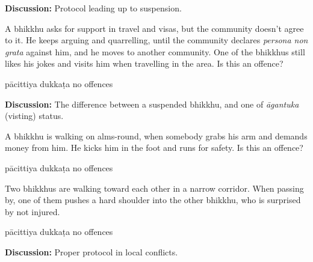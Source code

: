 \begin{exam}{\autoExamName}
\begin{problem}
  \textbf{Discussion:} Protocol leading up to suspension.

  \end{problem}

  \problemDivide

  \begin{problem}

    A bhikkhu asks for support in travel and visas, but the community doesn't
    agree to it. He keeps arguing and quarrelling, until the community declares
    \textit{persona non grata} against him, and he moves to another community.
    One of the bhikkhus still likes his jokes and visits him when travelling in
    the area. Is this an offence?

    \bigskip

    \begin{answers}{3}
      \bChoices
       pācittiya\eAns
       dukkaṭa\eAns
       no offences\eAns
      \eChoices
    \end{answers}

    \bigskip

    \textbf{Discussion:} The difference between a suspended bhikkhu, and one
    of \textit{āgantuka} (visting) status.

  \end{problem}

  \problemDivide

  \begin{problem}

    A bhikkhu is walking on alms-round, when somebody grabs his arm and demands money from him. 
    He kicks him in the foot and runs for safety. Is this an offence?

    \bigskip

    \begin{answers}{3}
      \bChoices
       pācittiya\eAns
       dukkaṭa\eAns
       no offences\eAns
      \eChoices
    \end{answers}

  \end{problem}

  \problemDivide

  \begin{problem}

    Two bhikkhus are walking toward each other in a narrow corridor. When
    passing by, one of them pushes a hard shoulder into the other bhikkhu, who
    is surprised by not injured.

    \bigskip

    \begin{answers}{3}
      \bChoices
       pācittiya\eAns
       dukkaṭa\eAns
       no offences\eAns
      \eChoices
    \end{answers}

    \bigskip

    \textbf{Discussion:} Proper protocol in local conflicts.

  \end{problem}

\end{exam}

